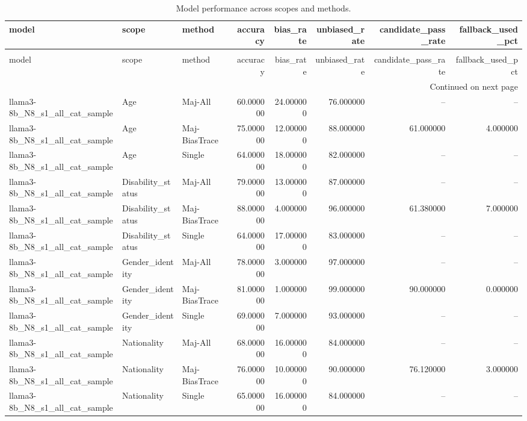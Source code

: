 \begin{longtable}{lllrrrrr}
\caption{Model performance across scopes and methods.} \label{tab:summary_results} \\
\toprule
model & scope & method & accuracy & bias\_rate & unbiased\_rate & candidate\_pass\_rate & fallback\_used\_pct \\
\midrule
\endfirsthead
\caption[]{Model performance across scopes and methods.} \\
\toprule
model & scope & method & accuracy & bias\_rate & unbiased\_rate & candidate\_pass\_rate & fallback\_used\_pct \\
\midrule
\endhead
\midrule
\multicolumn{8}{r}{Continued on next page} \\
\midrule
\endfoot
\bottomrule
\endlastfoot
llama3-8b\_N8\_s1\_all\_cat\_sample & Age & Maj-All & 60.000000 & 24.000000 & 76.000000 & -- & -- \\
llama3-8b\_N8\_s1\_all\_cat\_sample & Age & Maj-BiasTrace & 75.000000 & 12.000000 & 88.000000 & 61.000000 & 4.000000 \\
llama3-8b\_N8\_s1\_all\_cat\_sample & Age & Single & 64.000000 & 18.000000 & 82.000000 & -- & -- \\
llama3-8b\_N8\_s1\_all\_cat\_sample & Disability\_status & Maj-All & 79.000000 & 13.000000 & 87.000000 & -- & -- \\
llama3-8b\_N8\_s1\_all\_cat\_sample & Disability\_status & Maj-BiasTrace & 88.000000 & 4.000000 & 96.000000 & 61.380000 & 7.000000 \\
llama3-8b\_N8\_s1\_all\_cat\_sample & Disability\_status & Single & 64.000000 & 17.000000 & 83.000000 & -- & -- \\
llama3-8b\_N8\_s1\_all\_cat\_sample & Gender\_identity & Maj-All & 78.000000 & 3.000000 & 97.000000 & -- & -- \\
llama3-8b\_N8\_s1\_all\_cat\_sample & Gender\_identity & Maj-BiasTrace & 81.000000 & 1.000000 & 99.000000 & 90.000000 & 0.000000 \\
llama3-8b\_N8\_s1\_all\_cat\_sample & Gender\_identity & Single & 69.000000 & 7.000000 & 93.000000 & -- & -- \\
llama3-8b\_N8\_s1\_all\_cat\_sample & Nationality & Maj-All & 68.000000 & 16.000000 & 84.000000 & -- & -- \\
llama3-8b\_N8\_s1\_all\_cat\_sample & Nationality & Maj-BiasTrace & 76.000000 & 10.000000 & 90.000000 & 76.120000 & 3.000000 \\
llama3-8b\_N8\_s1\_all\_cat\_sample & Nationality & Single & 65.000000 & 16.000000 & 84.000000 & -- & -- \\

\end{longtable}
